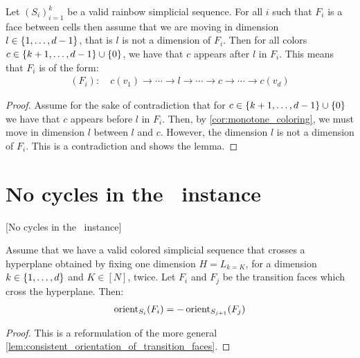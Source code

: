 \begin{lemma}\label{lem:ordering_of_vertices_in_transition_faces}
	Let ${\left(S_i\right)}_{i=1}^k$ be a valid rainbow simplicial sequence. For all $i$ such that $F_i$ is a face between cells then assume that we are moving in dimension $l \in \left\{1, \dots, d-1\right\}$, that is $l$ is not a dimension of $F_i$. Then for all colors $c \in \left\{k+1, \dots, d-1\right\} \cup \left\{0\right\}$, we have that $c$ appears after $l$ in $F_i$. This means that $F_i$ is of the form:
	\begin{align*}
		(F_i): \quad c(v_1) \xrightarrow{} \cdots \xrightarrow{} l \xrightarrow{} \cdots \xrightarrow{} c \xrightarrow{} \cdots \xrightarrow{} c(v_d)
	\end{align*}
\end{lemma}
\begin{proof}
	Assume for the sake of contradiction that for $c \in \left\{k+1, \dots, d-1\right\} \cup \left\{0\right\}$ we have that $c$ appears before $l$ in $F_i$. Then, by \cref{cor:monotone_coloring}, we must move in dimension $l$ between $l$ and $c$. However, the dimension $l$ is not a dimension of $F_i$. This is a contradiction and shows the lemma.
\end{proof}

\section{No cycles in the \EndOfLine\ instance}[No cycles in the \EndOfLine\ instance]

\begin{remark}
	Assume that we have a valid colored simplicial sequence that crosses a hyperplane obtained by fixing one dimension $H = L_{k = K}$, for a dimension $k \in \left\{1, \dots, d\right\}$ and $K \in [N]$, twice. Let $F_i$ and $F_j$ be the transition faces which cross the hyperplane. Then: 
	\begin{align*}
		\operatorname{orient}_{S_i}(F_i) = - \operatorname{orient}_{S_{j+1}}(F_j)
	\end{align*}
\end{remark}
\begin{proof}
	This is a reformulation of the more general \cref{lem:consistent_orientation_of_transition_faces}.
\end{proof}

